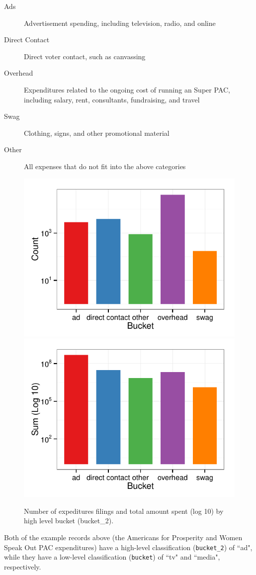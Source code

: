 \documentclass[11pt]{article}\usepackage{graphicx, color}
\newenvironment{knitrout}{}{} %
\begin{document}
\begin{description}
    \item[Ads] Advertisement spending, including television, radio, and online
    \item[Direct Contact] Direct voter contact, such as canvassing
    \item[Overhead] Expenditures related to the ongoing cost of running an Super PAC, including salary, rent, consultants, fundraising, and travel
    \item[Swag] Clothing, signs, and other promotional material
    \item[Other] All expenses that do not fit into the above categories
\end{description}

\begin{knitrout}
\color{fgcolor}\begin{figure}[H]


{\centering \includegraphics[width=.45\textwidth]{figure/bucket_plot1} 
\includegraphics[width=.45\textwidth]{figure/bucket_plot2} 

}

\caption[Number of expeditures filings and total amount spent (log 10) by high level bucket (bucket\_2)]{Number of expeditures filings and total amount spent (log 10) by high level bucket (bucket\_2).\label{fig:bucket_plot}}
\end{figure}


\end{knitrout}


Both of the example records above (the Americans for Prosperity and Women Speak Out PAC expenditures) have a high-level classification (\texttt{bucket\_2}) of ``ad", while they have a low-level classification (\texttt{bucket}) of ``tv" and ``media", respectively.
\end{document}
